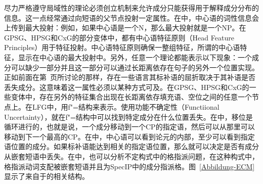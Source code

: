 尽力严格遵守局域性的理论必须创立机制来允许成分只能获得用于解释成分分布的信息。这一点经常通过向短语的父节点投射一定属性。在\xbartc 中，中心语的词性信息会上传到最大投射：例如，如果中心语是一个N，那么最大投射就是一个NP。在GPSG、HPSG和CxG的部分变体中，都有中心语特征原则（Head Feature Principles）用于特征投射。中心语特征原则确保一整组特征，所谓的中心语特征，显示在中心语的最大投射中。另外，任意一个理论都能表示以下现象：一个成分可以缺少一部分并且这一部分可以通过长距离依存在句子的另外一个位置实现。正如前面在第~\pageref{page-Irish-complementizers}页所讨论的那样，存在一些语言其标补语的屈折取决于其补语是否丢失成分。这意味着这一属性必须以某种方式可及。在GPSG、HPSG和CxG的一些变体中，存在另外的特征集合出现在长距离依存填充语、空位之间的任意一个节点上。在LFG中，用f"=结构来表示。使用功能不确定性（Functiional Uncertainty），就在f"=结构中可以找到特定成分在什么位置丢失。在\gbtc 中，移位是循环进行的，也就是说，一个成分移动到一个CP的指定语，然后可以从那里可以移动到下一个最高的CP。在\gbtc 中，中心语可以看到论元的内部，至少可以看到指定语位置的成分。如果标补语能达到相关的指定语位置，那么就可以决定是否有成分从嵌套短语中丢失。在\gbtc 中，也可以分析不定构式中的格指派问题，在这种构式中，格指派动词支配被嵌套短语并且为\mbox{SpecIP}中的成分指派格。图~\ref{Abbildung-ECM}显示了来自于的相关结构。
